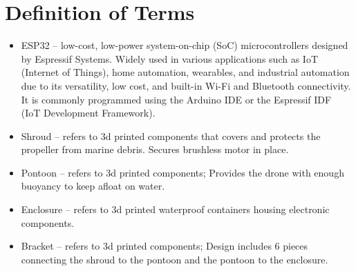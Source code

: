 \section{Definition of Terms}
\begin{itemize}
  \item ESP32 -- low-cost, low-power system-on-chip (SoC) microcontrollers designed by Espressif Systems. Widely used in various applications such as 
        IoT (Internet of Things), home automation, wearables, and industrial automation due to its versatility, low cost, and built-in Wi-Fi and Bluetooth
        connectivity. It is commonly programmed using the Arduino IDE or the Espressif IDF (IoT Development Framework).
  \item Shroud -- refers to 3d printed components that covers and protects the propeller from marine debris. Secures brushless motor in place.
  \item Pontoon -- refers to 3d printed components; Provides the drone with enough buoyancy to keep afloat on water.
  \item Enclosure -- refers to 3d printed waterproof containers housing electronic components. 
  \item Bracket -- refers to 3d printed components; Design includes 6 pieces connecting the shroud to the pontoon and the pontoon to the enclosure.
\end{itemize}